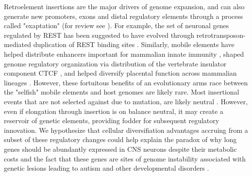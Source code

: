Retroelement insertions are the major drivers of genome expansion, and can also generate new promoters, exons and distal regulatory elements through a process called "exaptation" (for review see \citealt{Chuong_2016}). For example, the set of neuronal genes regulated by REST has been suggested to have evolved through retrotransposon-mediated duplication of REST binding sites \citep{Johnson_2006}. Similarly, mobile elements have helped distribute enhancers important for mammalian innate immunity \cite{Chuong_2016a}, shaped genome regulatory organization via distribution of the vertebrate insulator component CTCF \citep{Schmidt_2012}, and helped diversify placental function across mammalian lineages \citep{Chuong_2013}. However, these fortuitous benefits of an evolutionary arms race between the "selfish" mobile elements and host genomes are likely rare. Most insertional events that are not selected against due to mutation, are likely neutral \cite{Zhang_2011}. However, even if elongation through insertion is on balance neutral, it may create a reservoir of genetic elements, providing fodder for subsequent regulatory innovation. We hypothesize that cellular diversifiation advantages accruing from a subset of these regulatory changes could help explain the paradox of why long genes should be abundantly expressed in CNS neurons despite their metabolic costs and the fact that these genes are sites of genome instability associated with genetic lesions leading to autism and other developmental disorders \citep{Wei_2016}. 




